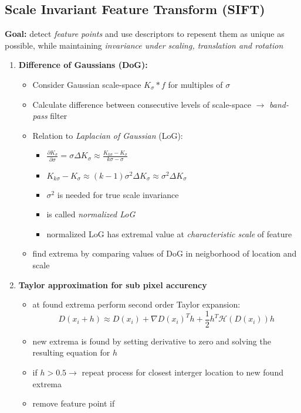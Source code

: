 \documentclass[11pt]{article}
\begin{document}
\subsection{Scale Invariant Feature Transform (SIFT)}
\label{sec-2-8}
\textbf{Goal:} detect \emph{feature points} and use descriptors to repesent them as unique as possible,
while maintaining \emph{invariance under scaling, translation and rotation}
\begin{enumerate}
\item \textbf{Difference of Gaussians (DoG):}
\begin{itemize}
\item Consider Gaussian scale-space $K_\sigma * f$ for multiples of $\sigma$
\item Calculate difference between consecutive levels of scale-space
        $\rightarrow$ \emph{band-pass} filter
\item Relation to \emph{Laplacian of Gaussian} (LoG):
\begin{itemize}
\item $\frac{\partial K_\sigma}{\partial \sigma} = \sigma \Delta K_\sigma
	  \approx \frac{K_{k\sigma}-K_\sigma}{k\sigma -\sigma}$
\item $K_{k\sigma}-K_\sigma \approx (k-1)\sigma^2 \Delta K_\sigma
	  \approx \sigma^2 \Delta K_\sigma$
\item $\sigma$$^{\text{2}}$ is needed for true scale invariance
\item is called \emph{normalized LoG}
\item normalized LoG has extremal value at \emph{characteristic scale} of feature
\end{itemize}
\item find extrema by comparing values of DoG in neigborhood of location and scale
\end{itemize}
\item \textbf{Taylor approximation for sub pixel accurency}
\begin{itemize}
\item at found extrema perform second order Taylor expansion:
        \[ D(x_i+h)\approx D(x_i)+\nabla D(x_i)^T h + \frac{1}{2}h^T \mathcal{H}(D(x_i))h \]
\item new extrema is found by setting derivative to zero and solving the resulting equation
for $h$
\item if $h>0.5 \rightarrow$ repeat process for closest interger location to new found extrema
\item remove feature point if
\begin{itemize}

\end{itemize}
\end{itemize}
\end{enumerate}
\end{document}
